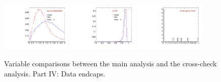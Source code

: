 \begin{figure}
  \includegraphics[width=0.3\textwidth]{Figures/VariablesComparison/Data_endcaps_figs/pvips}
  \includegraphics[width=0.3\textwidth]{Figures/VariablesComparison/Data_endcaps_figs/pvw8}
  \includegraphics[width=0.3\textwidth]{Figures/VariablesComparison/Data_endcaps_figs/KS}
  \caption{Variable comparisons between the main analysis and the cross-check analysis. Part IV: Data endcaps.}
  \label{fig:Data_endcaps_figs}
\end{figure}


